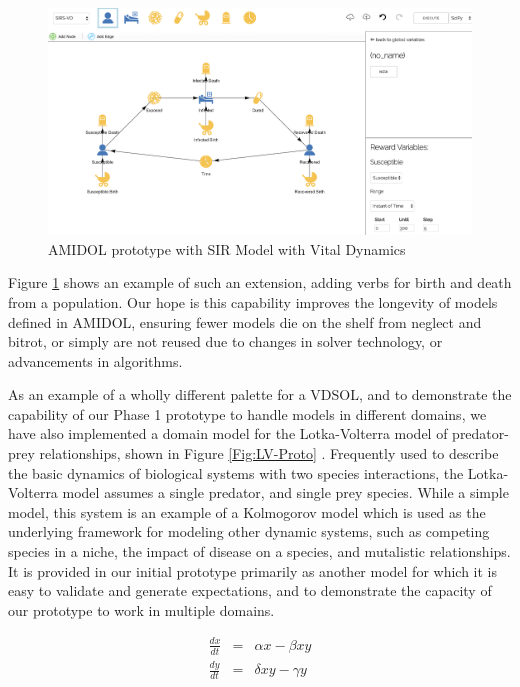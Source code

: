 \documentclass[11pt]{article}
\newcommand{\amidol}{\textsc{AMIDOL}}
\begin{document}
\begin{figure}
\includegraphics[width=\textwidth]{figs/SIR-VD.png}
\caption{\amidol{} prototype with SIR Model with Vital Dynamics}
\label{Fig:SIR-VD-Proto}
\end{figure}

Figure \ref{Fig:SIR-VD-Proto} shows an example of such an extension,
adding verbs for birth and death from a population.  Our hope is this
capability improves the longevity of models defined in \amidol{},
ensuring fewer models die on the shelf from neglect and bitrot, or
simply are not reused due to changes in solver technology, or
advancements in algorithms.

As an example of a wholly different palette for a VDSOL, and to
demonstrate the capability of our Phase 1 prototype to handle models
in different domains, we have also implemented a domain model for the
Lotka-Volterra model of predator-prey relationships, shown in Figure \ref{Fig:LV-Proto}
\cite{freedman1980deterministic,brauer2012mathematical,hoppensteadt2006predator}.
Frequently used to describe the basic dynamics of biological systems
with two species interactions, the Lotka-Volterra model assumes a
single predator, and single prey species.  While a simple model, this
system is an example of a Kolmogorov model which is used as the
underlying framework for modeling other dynamic systems, such as
competing species in a niche, the impact of disease on a species, and
mutalistic relationships.  It is provided in our initial prototype
primarily as another model for which it is easy to validate and
generate expectations, and to demonstrate the capacity of our
prototype to work in multiple domains.

\begin{eqnarray}
  \frac{dx}{dt} &=& \alpha x - \beta x y\\
  \frac{dy}{dt} &=& \delta x y - \gamma y
\end{eqnarray}
\end{document}

